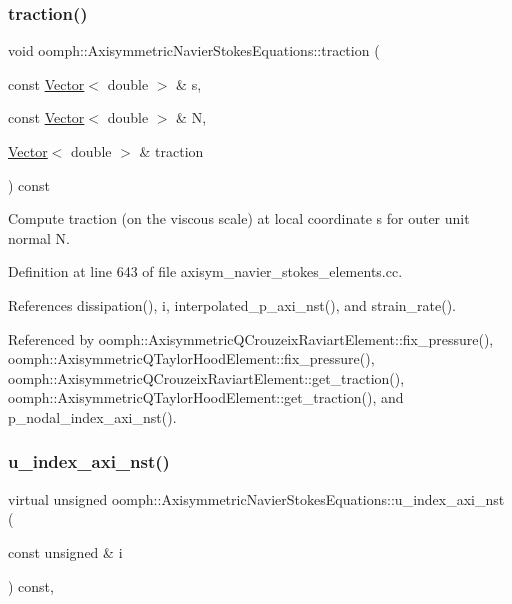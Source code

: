 \subsubsection{\texorpdfstring{traction()}{traction()}}
{\footnotesize\ttfamily void oomph\+::\+Axisymmetric\+Navier\+Stokes\+Equations\+::traction (\begin{DoxyParamCaption}\item[{const \hyperlink{classoomph_1_1Vector}{Vector}$<$ double $>$ \&}]{s,  }\item[{const \hyperlink{classoomph_1_1Vector}{Vector}$<$ double $>$ \&}]{N,  }\item[{\hyperlink{classoomph_1_1Vector}{Vector}$<$ double $>$ \&}]{traction }\end{DoxyParamCaption}) const}



Compute traction (on the viscous scale) at local coordinate s for outer unit normal N. 



Definition at line 643 of file axisym\+\_\+navier\+\_\+stokes\+\_\+elements.\+cc.



References dissipation(), i, interpolated\+\_\+p\+\_\+axi\+\_\+nst(), and strain\+\_\+rate().



Referenced by oomph\+::\+Axisymmetric\+Q\+Crouzeix\+Raviart\+Element\+::fix\+\_\+pressure(), oomph\+::\+Axisymmetric\+Q\+Taylor\+Hood\+Element\+::fix\+\_\+pressure(), oomph\+::\+Axisymmetric\+Q\+Crouzeix\+Raviart\+Element\+::get\+\_\+traction(), oomph\+::\+Axisymmetric\+Q\+Taylor\+Hood\+Element\+::get\+\_\+traction(), and p\+\_\+nodal\+\_\+index\+\_\+axi\+\_\+nst().

\mbox{\label{classoomph_1_1AxisymmetricNavierStokesEquations_afbdea50fcf4799e2e4e5209ee3249bf0}} 
\subsubsection{\texorpdfstring{u\+\_\+index\+\_\+axi\+\_\+nst()}{u\_index\_axi\_nst()}}
{\footnotesize\ttfamily virtual unsigned oomph\+::\+Axisymmetric\+Navier\+Stokes\+Equations\+::u\+\_\+index\+\_\+axi\+\_\+nst (\begin{DoxyParamCaption}\item[{const unsigned \&}]{i }\end{DoxyParamCaption}) const\hspace{0.3cm}{\ttfamily [inline]}, {\ttfamily [virtual]}}




